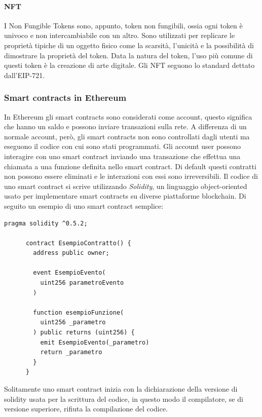 \documentclass[a4paper]{article}
\begin{document}
    \paragraph{NFT}
    I Non Fungible Tokens sono, appunto, token non fungibili, ossia ogni token è univoco e non intercambiabile con un altro. Sono utilizzati per replicare le proprietà tipiche
    di un oggetto fisico come la scarsità, l'unicità e la possibilità di dimostrare la proprietà del token\cite{nft}.
    Data la natura del token, l'uso più comune di questi token è la creazione di arte digitale\cite{nftuse}.
    \newline
    Gli NFT seguono lo standard dettato dall'EIP-721.
    \subsubsection{Smart contracts in Ethereum}
    In Ethereum gli smart contracts sono considerati come account, questo significa che hanno un saldo e possono inviare transazioni sulla rete. A differenza di un normale account, però,
    gli smart contracts non sono controllati dagli utenti ma eseguono il codice con cui sono stati programmati. Gli account user possono interagire con uno smart contract inviando una transazione
    che effettua una chiamata a una funzione definita nello smart contract. Di default questi contratti non possono essere eliminati e le interazioni con essi sono irreversibili.
    \newline
    Il codice di uno smart contract si scrive utilizzando \emph{Solidity}, un linguaggio object-oriented usato per implementare smart contracts su diverse piattaforme blockchain.
    Di seguito un esempio di uno smart contract semplice:
    \begin{lstlisting}[style=ES6, title={Esempio codice di uno smart contract}]
      pragma solidity ^0.5.2;

      contract EsempioContratto() {
        address public owner;
        
        event EsempioEvento(
          uint256 parametroEvento
        )

        function esempioFunzione(
          uint256 _parametro
        ) public returns (uint256) {
          emit EsempioEvento(_parametro)
          return _parametro
        }
      }\end{lstlisting}
      Solitamente uno smart contract inizia con la dichiarazione della versione di solidity usata per la scrittura del codice, in questo modo il compilatore, se di versione superiore, rifiuta la compilazione del codice.
\end{document}
